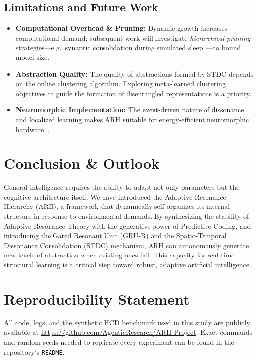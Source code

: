 \documentclass{article}
\begin{document}
\subsection{Limitations and Future Work}
\begin{itemize}
    \item \textbf{Computational Overhead \& Pruning:} Dynamic growth increases computational demand; subsequent work will investigate \emph{hierarchical pruning} strategies—e.g.\ synaptic consolidation during simulated sleep~\cite{sleep_replay2017}—to bound model size.
    \item \textbf{Abstraction Quality:} The quality of abstractions formed by STDC depends on the online clustering algorithm. Exploring meta-learned clustering objectives to guide the formation of disentangled representations is a priority.
    \item \textbf{Neuromorphic Implementation:} The event-driven nature of dissonance and localized learning makes ARH suitable for energy-efficient neuromorphic hardware~\cite{loihi2018}.
\end{itemize}

\section{Conclusion \& Outlook}

General intelligence requires the ability to adapt not only parameters but the cognitive architecture itself. We have introduced the Adaptive Resonance Hierarchy (ARH), a framework that dynamically self-organizes its internal structure in response to environmental demands. By synthesizing the stability of Adaptive Resonance Theory with the generative power of Predictive Coding, and introducing the Gated Resonant Unit (GRU-R) and the Spatio-Temporal Dissonance Consolidation (STDC) mechanism, ARH can autonomously generate new levels of abstraction when existing ones fail. This capacity for real-time structural learning is a critical step toward robust, adaptive artificial intelligence.

\section*{Reproducibility Statement}
All code, logs, and the synthetic \textsc{HCD} benchmark used in this study are publicly available at \url{https://github.com/AgenticResearch/ARH-Project}. Exact commands and random seeds needed to replicate every experiment can be found in the repository's \texttt{README}.
\end{document}
